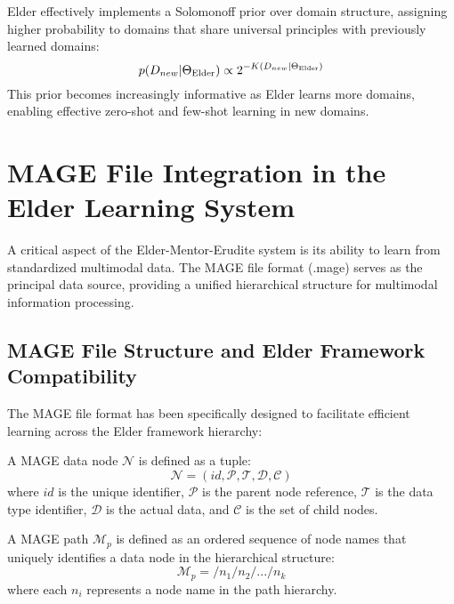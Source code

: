 \begin{proposition}
Elder effectively implements a Solomonoff prior over domain structure, assigning higher probability to domains that share universal principles with previously learned domains:
\begin{equation}
p(D_{new} | \Theta_{\text{Elder}}) \propto 2^{-K(D_{new} | \Theta_{\text{Elder}})}
\end{equation}
This prior becomes increasingly informative as Elder learns more domains, enabling effective zero-shot and few-shot learning in new domains.
\end{proposition}

\section{MAGE File Integration in the Elder Learning System}

A critical aspect of the Elder-Mentor-Erudite system is its ability to learn from standardized multimodal data. The MAGE file format (.mage) serves as the principal data source, providing a unified hierarchical structure for multimodal information processing.

\subsection{MAGE File Structure and Elder Framework Compatibility}

The MAGE file format has been specifically designed to facilitate efficient learning across the Elder framework hierarchy:

\begin{definition}
A MAGE data node $\mathcal{N}$ is defined as a tuple:
\begin{equation}
\mathcal{N} = (id, \mathcal{P}, \mathcal{T}, \mathcal{D}, \mathcal{C})
\end{equation}
where $id$ is the unique identifier, $\mathcal{P}$ is the parent node reference, $\mathcal{T}$ is the data type identifier, $\mathcal{D}$ is the actual data, and $\mathcal{C}$ is the set of child nodes.
\end{definition}

\begin{definition}
A MAGE path $\mathcal{M}_p$ is defined as an ordered sequence of node names that uniquely identifies a data node in the hierarchical structure:
\begin{equation}
\mathcal{M}_p = /n_1/n_2/.../n_k
\end{equation}
where each $n_i$ represents a node name in the path hierarchy.
\end{definition}

